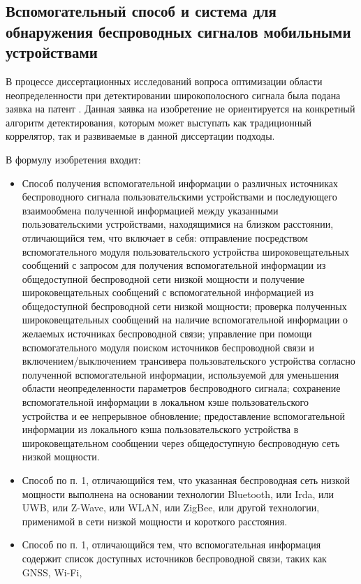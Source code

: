 \subsection{Вспомогательный способ и система для обнаружения беспроводных сигналов мобильными устройствами}

В процессе диссертационных исследований вопроса оптимизации области неопределенности при детектировании широкополосного сигнала была
подана заявка на патент \cite{patent_my}. Данная заявка на изобретение не ориентируется на конкретный алгоритм детектирования, которым
может выступать как традиционный коррелятор, так и развиваемые в данной диссертации подходы.

В формулу изобретения входит:
\begin{itemize}
	\item Способ получения вспомогательной информации о различных источниках беспроводного сигнала пользовательскими устройствами и последующего взаимообмена
	полученной информацией между указанными пользовательскими устройствами, находящимися на близком расстоянии, отличающийся тем, что включает в себя:
		\subitem отправление посредством вспомогательного модуля пользовательского устройства широковещательных сообщений с запросом для получения
		вспомогательной информации из общедоступной беспроводной сети низкой мощности и получение широковещательных сообщений с вспомогательной информацией
		из общедоступной беспроводной сети низкой мощности;
		\subitem проверка полученных широковещательных сообщений на наличие вспомогательной информации о желаемых источниках беспроводной связи;
		\subitem управление при помощи вспомогательного модуля поиском источников беспроводной связи и включением/выключением трансивера пользовательского
			устройства согласно полученной вспомогательной информации, используемой для уменьшения области неопределенности параметров беспроводного сигнала;
		\subitem сохранение вспомогательной информации в локальном кэше пользовательского устройства и ее непрерывное обновление;
		\subitem предоставление вспомогательной информации из локального кэша пользовательского устройства в широковещательном сообщении через общедоступную
			беспроводную сеть низкой мощности. 
	\item Способ по п. 1, отличающийся тем, что указанная беспроводная сеть низкой мощности выполнена на основании технологии Bluetooth, или Irda, или UWB, или Z-Wave,
		или WLAN, или ZigBee, или другой технологии, применимой в сети низкой мощности и короткого расстояния. 
	\item Способ по п. 1, отличающийся тем, что вспомогательная информация содержит список доступных источников беспроводной связи, таких как GNSS, Wi-Fi,

\end{itemize}
